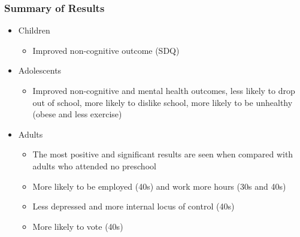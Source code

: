 \documentclass[static]{JJH-Beamer_PAGENOS}
\begin{document}

\begin{frame}
\frametitle{Summary of Results}
\begin{itemize}
	\item Children
	\begin{itemize}
		\item Improved non-cognitive outcome (SDQ)
	\end{itemize}
	\item Adolescents
	\begin{itemize}
		\item Improved non-cognitive and mental health outcomes, less likely to drop out of school, more likely to dislike school, more likely to be unhealthy (obese and less exercise)
	\end{itemize}
	\item Adults
		\begin{itemize}
		\item The most positive and significant results are seen when compared with adults who attended no preschool
		\item More likely to be employed (40s) and work more hours (30s and 40s)
		\item Less depressed and more internal locus of control (40s)
		\item More likely to vote (40s)
		\end{itemize}
\end{itemize}
\end{frame}

\end{document}
